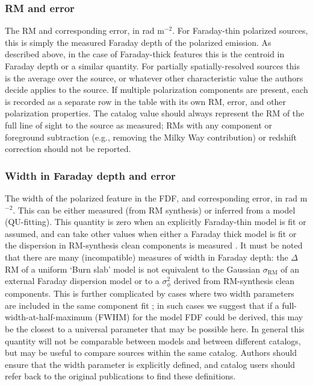 \documentclass[10pt,modern]{aastex63}
\newcommand{\radu}{rad m$^{-2}$}
\begin{document}
\subsubsection{RM and error}
The RM and corresponding error, in \radu. For Faraday-thin polarized sources, this is simply the measured Faraday depth of the polarized emission. As described above, in the case of Faraday-thick features this is the centroid in Faraday depth or a similar quantity. For partially spatially-resolved sources this is the average over the source, or whatever other characteristic value the authors decide applies to the source. If multiple polarization components are present, each is recorded as a separate row in the table with its own RM, error, and other polarization properties. The catalog value should always represent the RM of the full line of sight to the source as measured; RMs with any component or foreground subtraction (e.g., removing the Milky Way contribution) or redshift correction should not be reported.

\subsubsection{Width in Faraday depth and error}
The width of the polarized feature in the FDF, and corresponding error, in \radu. This can be either measured (from RM synthesis) or inferred from a model (QU-fitting). This quantity is zero when an explicitly Faraday-thin model is fit or assumed, and can take other values when either a Faraday thick model is fit \citep[e.g.,][]{Ma2019} or the dispersion in RM-synthesis clean components is measured \citep[e.g.,][]{Livingston2021}. It must be noted that there are many (incompatible) measures of width in Faraday depth: the $\Delta$RM of a uniform `Burn slab' model \citep{Burn66} is not equivalent to the Gaussian $\sigma_{\mathrm{RM}}$ of an external Faraday dispersion model \citep{Sokoloff98} or to a $\sigma^2_\phi$ derived from RM-synthesis clean components. This is further complicated by cases where two width parameters are included in the same component fit \citep[e.g., ][]{OSullivan2017}; in such cases we suggest that if a full-width-at-half-maximum (FWHM) for the model FDF could be derived, this may be the closest to a universal parameter that may be possible here. In general this quantity will not be comparable between models and between different catalogs, but may be useful to compare sources within the same catalog. Authors should ensure that the width parameter is explicitly defined, and catalog users should refer back to the original publications to find these definitions.
\end{document}
